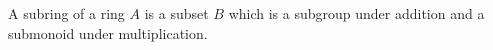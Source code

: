 A subring of a ring $A$ is a subset $B$ which is a subgroup under addition and a submonoid under multiplication.
